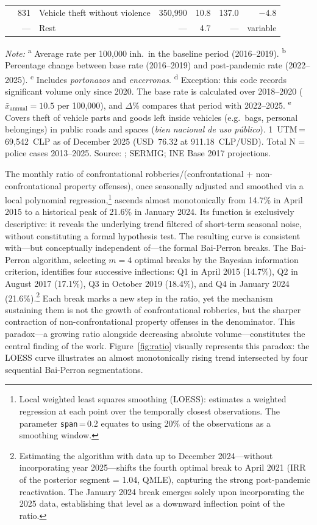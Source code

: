 \documentclass[pdflatex,sn-basic]{sn-jnl}
\newcommand{\tablenote}[1]{%
  \vspace{2pt}%
  {\par\footnotesize\textit{Note:} #1\par}%
}
\begin{document}
\begin{table}[htbp]
{\begin{tabular}{lrp{4.5cm}rrrr}
 & 831 & Vehicle theft without violence  & 350,990 & 10.8 & 137.0 & $-$4.8  \\
 & --- & Rest                          &    --- &  4.7 &   --- & variable \\
\bottomrule
\end{tabular}
}
\tablenote{\textsuperscript{a} Average rate per 100,000 inh.\ in the baseline period (2016--2019). \textsuperscript{b} Percentage change between base rate (2016--2019) and post-pandemic rate (2022--2025). \textsuperscript{c} Includes \textit{portonazos} and \textit{encerronas}. \textsuperscript{d} Exception: this code records significant volume only since 2020. The base rate is calculated over 2018--2020 ($\bar{x}_{\text{annual}} = 10.5$ per 100,000), and $\Delta$\% compares that period with 2022--2025. \textsuperscript{e} Covers theft of vehicle parts and goods left inside vehicles (e.g.\ bags, personal belongings) in public roads and spaces (\textit{bien nacional de uso p\'ublico}). 1~UTM\,=\,69,542~CLP as of December 2025 (USD~76.32 at 911.18~CLP/USD). Total N = police cases 2013--2025. Source: \citet{INE2026}; SERMIG; INE Base 2017 projections.}
\end{table}

The monthly ratio of confrontational robberies/(confrontational + non-confrontational property offenses), once seasonally adjusted and smoothed via a local polynomial regression,\footnote{Local weighted least squares smoothing (LOESS): estimates a weighted regression at each point over the temporally closest observations. The parameter \texttt{span}\,=\,0.2 equates to using 20\% of the observations as a smoothing window.} ascends almost monotonically from 14.7\% in April 2015 to a historical peak of 21.6\% in January 2024. Its function is exclusively descriptive: it reveals the underlying trend filtered of short-term seasonal noise, without constituting a formal hypothesis test. The resulting curve is consistent with---but conceptually independent of---the formal Bai-Perron breaks. The Bai-Perron algorithm, selecting $m=4$ optimal breaks by the Bayesian information criterion, identifies four successive inflections: Q1 in April 2015 (14.7\%), Q2 in August 2017 (17.1\%), Q3 in October 2019 (18.4\%), and Q4 in January 2024 (21.6\%).\footnote{Estimating the algorithm with data up to December 2024---without incorporating year 2025---shifts the fourth optimal break to April 2021 (IRR of the posterior segment = 1.04, QMLE), capturing the strong post-pandemic reactivation. The January 2024 break emerges solely upon incorporating the 2025 data, establishing that level as a downward inflection point of the ratio.} Each break marks a new step in the ratio, yet the mechanism sustaining them is not the growth of confrontational robberies, but the sharper contraction of non-confrontational property offenses in the denominator. This paradox---a growing ratio alongside decreasing absolute volume---constitutes the central finding of the work. Figure~\ref{fig:ratio} visually represents this paradox: the LOESS curve illustrates an almost monotonically rising trend intersected by four sequential Bai-Perron segmentations.
\end{document}
